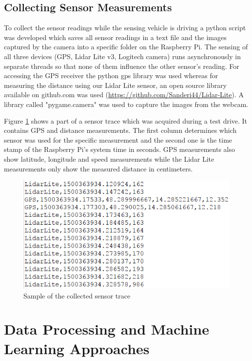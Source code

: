 \section{Collecting Sensor Measurements}

To collect the sensor readings while the sensing vehicle is driving a python script was developed which saves all sensor readings in a text file and the images captured by the camera into a specific folder on the Raspberry Pi. The sensing of all three devices (GPS, Lidar Lite v3, Logitech camera) runs asynchronously in separate threads so that none of them influence the other sensor's reading. For accessing the GPS receiver the python gps library was used whereas for measuring the distance using our Lidar Lite sensor, an open source library available on github.com was used (\url{https://github.com/Sanderi44/Lidar-Lite}). A library called "pygame.camera" was used to capture the images from the webcam. 

Figure \ref{fig:sample_sensor_trace} shows a part of a sensor trace which was acquired during a test drive. It contains GPS and distance measurements. The first column determines which sensor was used for the specific measurement and the second one is the time stamp of the Raspberry Pi's system time in seconds. GPS measurements also show latitude, longitude and speed measurements while the Lidar Lite measurements only show the measured distance in centimeters.

\begin{figure}
	\centering
	\includegraphics{img/sample-sensor-trace.PNG}
	\caption{Sample of the collected sensor trace}
	\label{fig:sample_sensor_trace}
\end{figure}







\chapter{Data Processing and Machine Learning Approaches}

